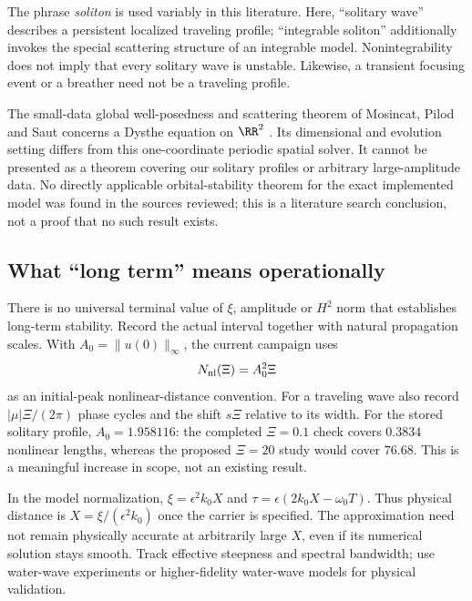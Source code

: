 \documentclass[11pt]{article}
\begin{document}
The phrase \emph{soliton} is used variably in this literature. Here, ``solitary
wave'' describes a persistent localized traveling profile; ``integrable soliton''
additionally invokes the special scattering structure of an integrable model.
Nonintegrability does not imply that every solitary wave is unstable. Likewise,
a transient focusing event or a breather need not be a traveling profile.

The small-data global well-posedness and scattering theorem of Mosincat, Pilod
and Saut concerns a Dysthe equation on $\RR^2$ \cite{mps}. Its dimensional and
evolution setting differs from this one-coordinate periodic spatial solver.
It cannot be presented as a theorem covering our solitary profiles or arbitrary
large-amplitude data. No directly applicable orbital-stability theorem for the
exact implemented model was found in the sources reviewed; this is a literature
search conclusion, not a proof that no such result exists.

\subsection{What ``long term'' means operationally}
There is no universal terminal value of $\xi$, amplitude or $H^2$ norm that
establishes long-term stability. Record the actual interval together with
natural propagation scales. With $A_0=\|u(0)\|_\infty$, the current campaign uses
\[
N_{\rm nl}(\Xi)=A_0^2\Xi
\]
as an initial-peak nonlinear-distance convention. For a traveling wave also
record $|\mu|\Xi/(2\pi)$ phase cycles and the shift $s\Xi$ relative to its width.
For the stored solitary profile, $A_0=1.958116$: the completed $\Xi=0.1$ check
covers $0.3834$ nonlinear lengths, whereas the proposed $\Xi=20$ study would
cover $76.68$. This is a meaningful increase in scope, not an existing result.

In the model normalization, $\xi=\epsilon^2k_0X$ and
$\tau=\epsilon(2k_0X-\omega_0T)$. Thus physical distance is
$X=\xi/(\epsilon^2k_0)$ once the carrier is specified. The approximation need
not remain physically accurate at arbitrarily large $X$, even if its numerical
solution stays smooth. Track effective steepness and spectral bandwidth; use
water-wave experiments or higher-fidelity water-wave models for physical validation.

\newpage
\end{document}
